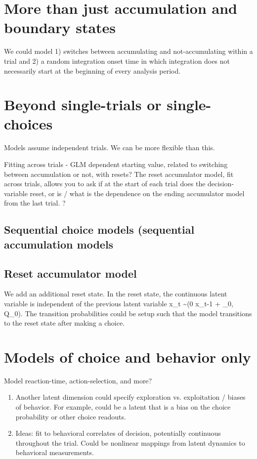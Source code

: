\documentclass{article}
\begin{document}
\section{More than just accumulation and boundary states}
We could model 1) switches between accumulating and not-accumulating within a trial and 2) a random integration onset time in which integration does not necessarily start at the beginning of every analysis period. 

\section{Beyond single-trials or single-choices \cite{huk2018beyond}}
Models assume independent trials. We can be more flexible than this. 

Fitting across trials - GLM dependent starting value, related to switching between accumulation or not, with resets?
The reset accumulator model, fit across trials, allows you to ask if at the start of each trial does the decision-variable reset, or is / what is the dependence on the ending accumulator model from the last trial. ?

\subsection{Sequential choice models (sequential accumulation models}

\subsection{Reset accumulator model}
We add an additional reset state. In the reset state, the continuous latent variable is independent of the previous latent variable
\be
x_t \sim {}(0 x_{t-1} + \mu_0, Q_0).
\ee
The transition probabilities could be setup such that the model transitions to the reset state after making a choice. 

\section{Models of choice and behavior only}

Model reaction-time, action-selection, and more? 
\begin{enumerate}
\item Another latent dimension could specify exploration vs. exploitation / biases of behavior. For example, could be a latent that is a bias on the choice probability or other choice readouts. 
\item Ideas: fit to behavioral correlates of decision, potentially continuous throughout the trial. Could be nonlinear mappings from latent dynamics to behavioral measurements.
\end{enumerate}
\end{document}
